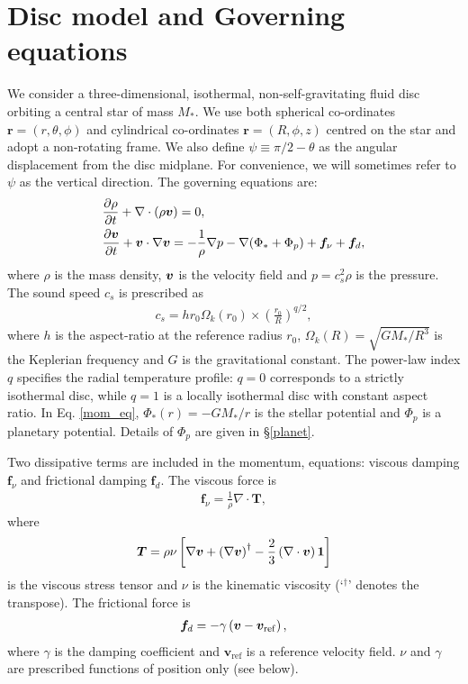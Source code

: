 \section{Disc model and Governing equations}\label{model} 
We consider a three-dimensional, isothermal,
non-self-gravitating fluid disc orbiting a central 
star of mass $M_*$. We use both spherical co-ordinates
$\bm{r}=(r,\theta,\phi)$ and cylindrical co-ordinates  
$\bm{r}=(R, \phi, z)$ centred on the star and 
adopt a non-rotating frame. We also define $\psi \equiv \pi/2 -
\theta$ as the angular displacement from the disc midplane. For
convenience, we will sometimes refer to $\psi$ as the vertical
direction. The governing equations are: 
\begin{align}
  &\frac{\partial\rho}{\partial t} + \nabla\cdot\left(\rho\bm{v}\right) =
  0,\label{cont_eq}\\ 
  &\frac{\partial\bm{v}}{\partial t} + \bm{v}\cdot\nabla\bm{v} = -\frac{1}{\rho}\nabla
  p -\nabla{\left(\Phi_*+\Phi_p\right)} +\bm{f}_\nu + \bm{f}_d\label{mom_eq},    
\end{align}
where $\rho$ is the mass density, $\bm{v}$ is the velocity field and 
$p=c_s^2\rho$ is the pressure. The sound speed $c_s$ is prescribed as 
\begin{align}
  c_s = hr_0\Omega_k(r_0)\times\left(\frac{r_0}{R}\right)^{q/2}, 
\end{align}
where $h$ is the aspect-ratio at the reference radius $r_0$, 
$\Omega_k(R) = \sqrt{GM_*/R^3}$ is the Keplerian frequency and $G$ is
the gravitational constant. The power-law index $q$ specifies the
radial temperature profile: $q=0$ corresponds to a strictly isothermal
disc, while $q=1$ is a locally isothermal disc with constant aspect
ratio. In Eq. \ref{mom_eq}, $\Phi_*(r) = -GM_*/r $ is the stellar
potential and $\Phi_p$ is a planetary potential. Details of $\Phi_p$
are given in \S\ref{planet}. 

Two dissipative terms are included in the momentum, equations: viscous
damping $\bm{f}_\nu$ and frictional damping $\bm{f}_d$. The viscous
force is 
\begin{align}
  \bm{f}_\nu = \frac{1}{\rho}\nabla\cdot\bm{T},
\end{align}
where 
\begin{align}
  \bm{T} = \rho\nu \left[\nabla\bm{v} + \left(\nabla\bm{v}\right)^\dagger
    - \frac{2}{3}\left(\nabla\cdot\bm{v}\right)\bm{1} \right]
\end{align}
is the viscous stress tensor and $\nu$ is the kinematic viscosity 
(`$^\dagger$' denotes the transpose). The frictional force is 
\begin{align}
  \bm{f}_d = -\gamma\left(\bm{v} - \bm{v}_\mathrm{ref}\right),
\end{align}
where $\gamma$ is the damping coefficient and
$\bm{v}_\mathrm{ref}$ is a reference velocity field. 
$\nu$ and $\gamma$ are prescribed functions of position only (see
below). %

